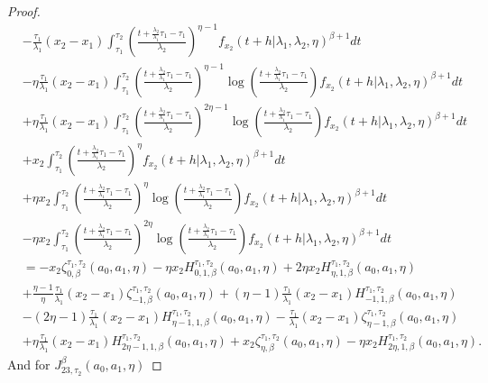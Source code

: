 \documentclass{article}
\begin{document}
\begin{proof}
\begin{align*}
&-\frac{\tau_1}{\lambda_1}(x_2-x_1) \int_{\tau_1}^{\tau_2}\left(\frac{t+\frac{\lambda_2}{\lambda_1}\tau_1-\tau_1}{\lambda_2}\right)^{\eta-1}f_{x_2}(t+h|\lambda_1,\lambda_2,\eta)^{\beta+1}dt
\\
&-\eta\frac{\tau_1}{\lambda_1}(x_2-x_1) \int_{\tau_1}^{\tau_2}\left(\frac{t+\frac{\lambda_2}{\lambda_1}\tau_1-\tau_1}{\lambda_2}\right)^{\eta-1}\log\left(\frac{t+\frac{\lambda_2}{\lambda_1}\tau_1-\tau_1}{\lambda_2}\right)f_{x_2}(t+h|\lambda_1,\lambda_2,\eta)^{\beta+1}dt
\\
&+\eta\frac{\tau_1}{\lambda_1}(x_2-x_1) \int_{\tau_1}^{\tau_2}\left(\frac{t+\frac{\lambda_2}{\lambda_1}\tau_1-\tau_1}{\lambda_2}\right)^{2\eta-1}\log\left(\frac{t+\frac{\lambda_2}{\lambda_1}\tau_1-\tau_1}{\lambda_2}\right)f_{x_2}(t+h|\lambda_1,\lambda_2,\eta)^{\beta+1}dt
\\
& +x_2 \int_{\tau_1}^{\tau_2}\left(\frac{t+\frac{\lambda_2}{\lambda_1}\tau_1-\tau_1}{\lambda_2}\right)^{\eta}f_{x_2}(t+h|\lambda_1,\lambda_2,\eta)^{\beta+1}dt
\\
&+\eta x_2 \int_{\tau_1}^{\tau_2}\left(\frac{t+\frac{\lambda_2}{\lambda_1}\tau_1-\tau_1}{\lambda_2}\right)^{\eta}\log\left(\frac{t+\frac{\lambda_2}{\lambda_1}\tau_1-\tau_1}{\lambda_2}\right)f_{x_2}(t+h|\lambda_1,\lambda_2,\eta)^{\beta+1}dt
\\
&-\eta x_2  \int_{\tau_1}^{\tau_2}\left(\frac{t+\frac{\lambda_2}{\lambda_1}\tau_1-\tau_1}{\lambda_2}\right)^{2\eta}\log\left(\frac{t+\frac{\lambda_2}{\lambda_1}\tau_1-\tau_1}{\lambda_2}\right)f_{x_2}(t+h|\lambda_1,\lambda_2,\eta)^{\beta+1}dt
\\
&=- x_2 \zeta_{0,\beta}^{\tau_1,\tau_2}(a_0,a_1,\eta)
-\eta x_2H_{0,1,\beta}^{\tau_1,\tau_2}(a_0,a_1,\eta)
 +2\eta x_2 H_{\eta,1,\beta}^{\tau_1,\tau_2}(a_0,a_1,\eta)
 \\
&
+ \frac{\eta-1}{\eta}\frac{\tau_1}{\lambda_1}(x_2-x_1)\zeta_{-1,\beta}^{\tau_1,\tau_2}(a_0,a_1,\eta)
+(\eta-1)\frac{\tau_1}{\lambda_1}(x_2-x_1)H_{-1,1,\beta}^{\tau_1,\tau_2}(a_0,a_1,\eta)
\\
&
-(2\eta-1)\frac{\tau_1}{\lambda_1}(x_2-x_1)H_{\eta-1,1,\beta}^{\tau_1,\tau_2}(a_0,a_1,\eta)
-\frac{\tau_1}{\lambda_1}(x_2-x_1) \zeta_{\eta-1,\beta}^{\tau_1,\tau_2}(a_0,a_1,\eta)
\\
&
+\eta\frac{\tau_1}{\lambda_1}(x_2-x_1)H_{2\eta-1,1,\beta}^{\tau_1,\tau_2}(a_0,a_1,\eta)
 +x_2\zeta_{\eta,\beta}^{\tau_1,\tau_2}(a_0,a_1,\eta)
-\eta x_2 H_{2\eta,1,\beta}^{\tau_1,\tau_2}(a_0,a_1,\eta).
\end{align*}
And for $J_{23,\tau_2}^{\beta}(a_0,a_1,\eta)$

\end{proof}
\end{document}
